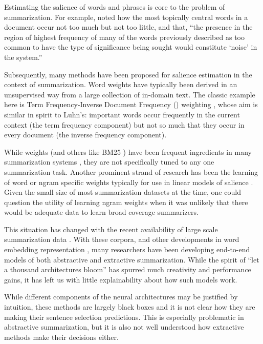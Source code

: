 
Estimating the salience of words and phrases is core to the problem of 
summarization. For example, \cite{luhn1958automatic} 
noted how the most topically central words in a document occur not too much 
but not
too little, and that,
``the presence in the region of highest frequency of many of the words
 previously described as too common to have the  type  of
 significance being sought would constitute
`noise' in the system.''

Subsequently, many methods have been proposed for salience estimation
in the context of summarization. Word weights have typically been derived
in an unsupervised way from a large collection of in-domain text.
The classic example here is Term Frequency-Inverse Document Frequency
(\tfidf) weighting \citep{sparck1972statistical}, whose aim is similar in 
spirit to Luhn's: important 
words occur frequently in the current context (the term frequency component)
 but not so much that they occur in every document 
(the inverse frequency component).

While \tfidf weights (and others like BM25 \citep{bm25}) have been frequent
ingredients in many summarization systems \citep{a,b,c,d,e}, they are 
not specifically tuned to any one summarization task. Another prominent
strand of research has been the learning of word or ngram specific weights
typically for use in linear models of salience \citep{martins2009summarization,woodsend2010automatic,berg2011jointly,durrett2016learning}. 
Given the small size of most summarization datasets at the time, one could question 
the utility of learning ngram weights when it was unlikely that there 
would be adequate data to learn broad coverage summarizers.

This 
situation has changed with the recent availability of large scale summarization data \citep{cnndm,newsroom,nyt}. With these corpora,
and other developments in word embedding representation \citep{miklov,glove},
many researchers have been developing end-to-end models of both 
abstractive \citep{abs} and extractive \citep{ext} summarization.
While the spirit of ``let a thousand architectures bloom'' has spurred much
creativity and performance gains, it has left us with little explainability
about how such models work. 

While different components of the neural architectures may be justified 
by intuition, these methods are largely black boxes and it is not clear
how they are making their sentence selection predictions. This is especially
problematic in abstractive summarization, but it is also not well understood
how extractive methods make their decisions either.

